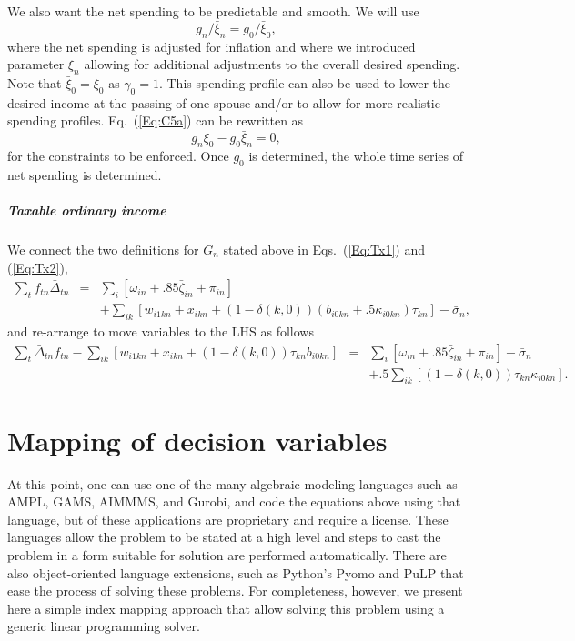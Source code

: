 \documentclass{report}[fleqn,12pt]
\begin{document}
	We also want the net spending to be predictable and smooth. We will use
\begin{equation}
	\label{Eq:C5a}
	g_{n}/\bar{\xi}_{n} = g_0/\bar{\xi}_0,
\end{equation}
where the net spending is adjusted for inflation and where we introduced parameter $\xi_n$ 
allowing for additional adjustments to the overall desired spending.
Note that $\bar{\xi}_0 = \xi_0$ as $\gamma_0=1$.
This spending profile can also be used to lower the desired income at the passing
of one spouse and/or to allow for more realistic spending profiles.
Eq.~(\ref{Eq:C5a}) can be rewritten as
\begin{equation}
	\label{Eq:C5}
	g_n \xi_0 - g_0 \bar{\xi}_n = 0,
\end{equation}
for the constraints to be enforced. Once $g_0$ is determined, the whole time series of net spending
is determined.

\paragraph*{Taxable ordinary income}
	We connect the two definitions for $G_n$ stated above in Eqs.~(\ref{Eq:Tx1}) and (\ref{Eq:Tx2}),
	\begin{eqnarray}
		\sum_t f_{t n}\bar{\Delta}_{t n} &=&
		\sum_i [\omega_{in} + .85\bar\zeta_{in} + \pi_{in}]  \nonumber \\
		&& + \sum_{ik} [w_{i1kn} + x_{ikn} + (1 - \delta(k, 0))(b_{i0kn} +
		.5\kappa_{i0kn})\tau_{kn}] - \bar{\sigma}_n,
	\end{eqnarray}
	and re-arrange to move variables to the LHS as follows
	\begin{eqnarray}
		\label{Eq:C6}
		\sum_t \bar{\Delta}_{t n} f_{t n}
		- \sum_{ik} [
			w_{i1kn} + x_{ikn} +
			(1 - \delta(k, 0))\tau_{kn}b_{i0kn}] &=&
		\sum_i [\omega_{in} + .85\bar\zeta_{in} + \pi_{in} ] 
		- \bar{\sigma}_n
		\nonumber \\
		&& + .5\sum_{ik} [(1-\delta(k, 0))\tau_{kn}\kappa_{i0kn}].
	\end{eqnarray}

\chapter{Mapping of decision variables}
At this point, one can use one of the many algebraic modeling languages
such as AMPL, GAMS, AIMMMS, and Gurobi, and code the equations above
using that language, but of these applications are
proprietary and require a license.
These languages allow the problem to be stated at a high level and
steps to cast the problem in a form suitable for solution are performed automatically.
There are also object-oriented language extensions, such as Python's Pyomo
and PuLP that ease the process of solving these problems.
For completeness, however, we present here a simple
index mapping approach that allow solving this problem using a generic
linear programming solver.
\end{document}
